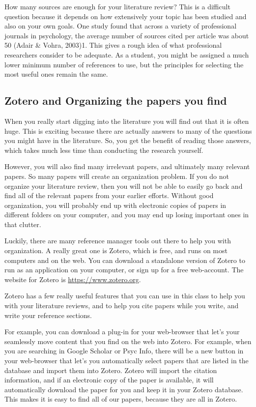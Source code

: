 How many sources are enough for your literature review? This is a difficult question because it depends on how extensively your topic has been studied and also on your own goals. One study found that across a variety of professional journals in psychology, the average number of sources cited per article was about 50 (Adair \& Vohra, 2003)1. This gives a rough idea of what professional researchers consider to be adequate. As a student, you might be assigned a much lower minimum number of references to use, but the principles for selecting the most useful ones remain the same.

\subsection{Zotero and Organizing the papers you find}

When you really start digging into the literature you will find out that it is often huge. This is exciting because there are actually answers to many of the questions you might have in the literature. So, you get the benefit of reading those answers, which takes much less time than conducting the research yourself. 

However, you will also find many irrelevant papers, and ultimately many relevant papers. So many papers will create an organization problem. If you do not organize your literature review, then you will not be able to easily go back and find all of the relevant papers from your earlier efforts. Without good organization, you will probably end up with electronic copies of papers in different folders on your computer, and you may end up losing important ones in that clutter.

Luckily, there are many reference manager tools out there to help you with organization. A really great one is Zotero, which is free, and runs on most computers and on the web. You can download a standalone version of Zotero to run as an application on your computer, or sign up for a free web-account. The website for Zotero is \url{https://www.zotero.org}.

Zotero has a few really useful features that you can use in this class to help you with your literature reviews, and to help you cite papers while you write, and write your reference sections.

For example, you can download a plug-in for your web-browser that let's your seamlessly move content that you find on the web into Zotero. For example, when you are searching in Google Scholar or Psyc Info, there will be a new button in your web-browser that let's you automatically select papers that are listed in the database and import them into Zotero. Zotero will import the citation information, and if an electronic copy of the paper is available, it will automatically download the paper for you and keep it in your Zotero database. This makes it is easy to find all of our papers, because they are all in Zotero.

